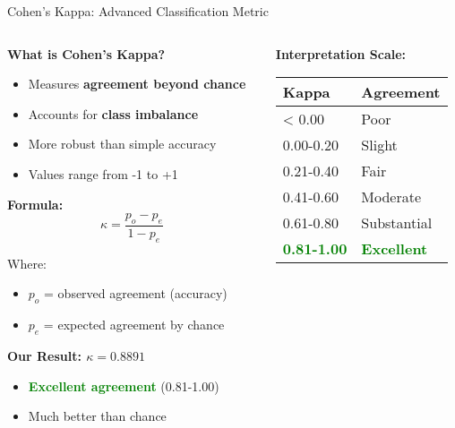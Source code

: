 \documentclass[aspectratio=169]{beamer}
\begin{document}
\begin{frame}{Cohen's Kappa: Advanced Classification Metric}
\begin{columns}
\begin{column}{0.6\textwidth}
\textbf{What is Cohen's Kappa?}
\begin{itemize}
\item Measures \textbf{agreement beyond chance}
\item Accounts for \textbf{class imbalance}
\item More robust than simple accuracy
\item Values range from -1 to +1
\end{itemize}

\vspace{0.3cm}
\textbf{Formula:}
$$\kappa = \frac{p_o - p_e}{1 - p_e}$$

Where:
\begin{itemize}
\item $p_o$ = observed agreement (accuracy)
\item $p_e$ = expected agreement by chance
\end{itemize}

\vspace{0.3cm}
\textbf{Our Result: $\kappa = 0.8891$}
\begin{itemize}
\item \textcolor{green}{\textbf{Excellent agreement}} (0.81-1.00)
\item Much better than chance
\end{itemize}
\end{column}
\begin{column}{0.4\textwidth}
\textbf{Interpretation Scale:}
\begin{table}[h]
\centering
\small
\begin{tabular}{@{}ll@{}}
\toprule
\textbf{Kappa} & \textbf{Agreement} \\
\midrule
< 0.00 & Poor \\
0.00-0.20 & Slight \\
0.21-0.40 & Fair \\
0.41-0.60 & Moderate \\
0.61-0.80 & Substantial \\
\textcolor{green}{\textbf{0.81-1.00}} & \textcolor{green}{\textbf{Excellent}} \\
\bottomrule
\end{tabular}
\end{table}


\end{column}
\end{columns}
\end{frame}
\end{document}

